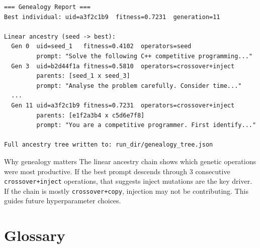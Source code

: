 \documentclass[11pt,a4paper]{report}
\newcommand{\fn}[1]{\texttt{#1}}
\begin{document}
\begin{lstlisting}[style=chain]
=== Genealogy Report ===
Best individual: uid=a3f2c1b9  fitness=0.7231  generation=11

Linear ancestry (seed -> best):
  Gen 0  uid=seed_1   fitness=0.4102  operators=seed
         prompt: "Solve the following C++ competitive programming..."
  Gen 3  uid=b2d44f1a fitness=0.5810  operators=crossover+inject
         parents: [seed_1 x seed_3]
         prompt: "Analyse the problem carefully. Consider time..."
  ...
  Gen 11 uid=a3f2c1b9 fitness=0.7231  operators=crossover+inject
         parents: [e1f2a3b4 x c5d6e7f8]
         prompt: "You are a competitive programmer. First identify..."

Full ancestry tree written to: run_dir/genealogy_tree.json
\end{lstlisting}

\begin{concept}{Why genealogy matters}
The linear ancestry chain shows which genetic operations were most productive.
If the best prompt descends through 3 consecutive \fn{crossover+inject} operations,
that suggests inject mutations are the key driver.  If the chain is mostly
\fn{crossover+copy}, injection may not be contributing.  This guides future
hyperparameter choices.
\end{concept}


\chapter*{Glossary}
\end{document}
